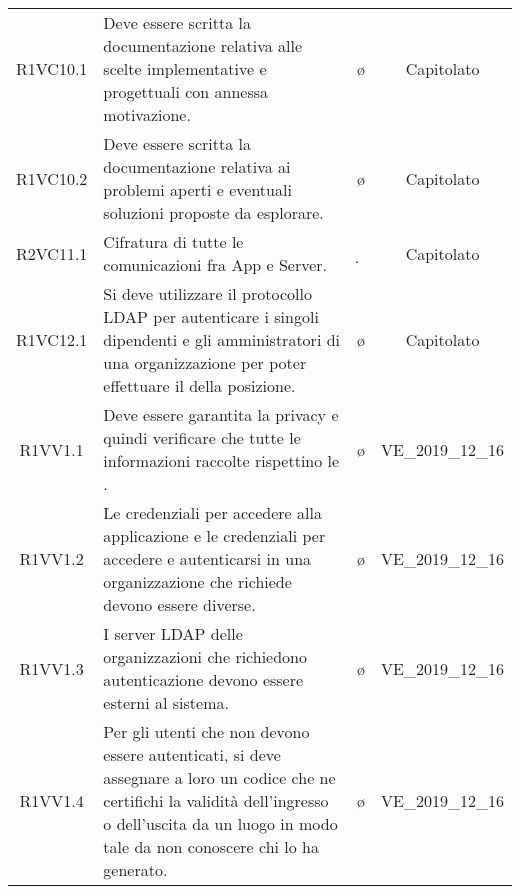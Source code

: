 {\begin{longtable}{ c C{6.5cm} c c}
R1VC10.1 & Deve essere scritta la documentazione relativa alle scelte implementative e progettuali con annessa motivazione. & \o & Capitolato \\
R1VC10.2 & Deve essere scritta la documentazione relativa ai problemi aperti e eventuali soluzioni proposte da esplorare. & \o & Capitolato \\
R2VC11.1 & Cifratura di tutte le comunicazioni fra App e Server. & \d & Capitolato  \\
R1VC12.1 & Si deve utilizzare il protocollo LDAP per autenticare i singoli dipendenti e gli amministratori di una organizzazione per poter effettuare il  della posizione. & \o & Capitolato \\	
R1VV1.1 & Deve essere garantita la privacy e quindi verificare che tutte le informazioni raccolte rispettino le . & \o & VE\_2019\_12\_16 \\
R1VV1.2 & Le credenziali per accedere alla applicazione e le credenziali per accedere e autenticarsi in una organizzazione che richiede  devono essere diverse. & \o & VE\_2019\_12\_16 \\
R1VV1.3 & I server LDAP delle organizzazioni che richiedono autenticazione devono essere esterni al sistema.  & \o & VE\_2019\_12\_16 \\
R1VV1.4 & Per gli utenti che non devono essere autenticati, si deve assegnare a loro un codice che ne certifichi la validità dell’ingresso o dell'uscita da un luogo in modo tale da non conoscere chi lo ha generato. & \o & VE\_2019\_12\_16 \\
\end{longtable}
}